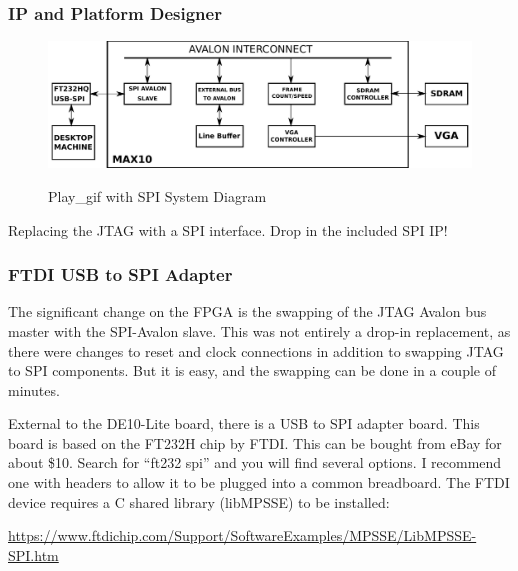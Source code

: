 \documentclass{beamer}
\begin{document}
\begin{frame}
\frametitle{IP and Platform Designer}

\begin{figure}[h]
	\centering
	\includegraphics[width=1.0\textwidth]{graphics/spi_avalon_system}
	\centering\bfseries
	\caption{Play\_gif with SPI System Diagram}
\end{figure}

Replacing the JTAG with a SPI interface.  Drop in the included SPI IP!

\end{frame}

\begin{frame}
\frametitle{FTDI USB to SPI Adapter}

The significant change on the FPGA is the swapping of the JTAG Avalon bus master with the SPI-Avalon slave.  This was not entirely a drop-in replacement, as there were changes to reset and clock connections in addition to swapping JTAG to SPI components.  But it is easy, and the swapping can be done in a couple of minutes.

External to the DE10-Lite board, there is a USB to SPI adapter board.  This board is based on the FT232H chip by FTDI.  This can be bought from eBay for about \$10.  Search for ``ft232 spi'' and you will find several options.  I recommend one with headers to allow it to be plugged into a common breadboard.  The FTDI device requires a C shared library (libMPSSE) to be installed:

\url{https://www.ftdichip.com/Support/SoftwareExamples/MPSSE/LibMPSSE-SPI.htm}

\end{frame}
\end{document}
